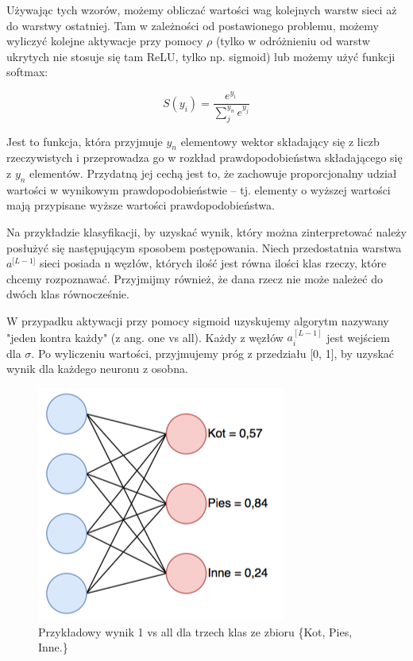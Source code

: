 Używając tych wzorów, możemy obliczać wartości wag kolejnych warstw sieci aż do warstwy ostatniej. Tam w zależności od postawionego problemu, możemy wyliczyć kolejne aktywacje przy pomocy \(\rho\) (tylko w odróżnieniu od warstw ukrytych nie stosuje się tam ReLU, tylko np. sigmoid) lub możemy użyć funkcji softmax:

\[S(y_{i}) = \frac{e^{y_{\text{i\ }}}}{\sum_{j}^{y_{n}}e^{y_{j}}}\]

Jest to funkcja, która przyjmuje \(y_{n}\) elementowy wektor składający się z liczb rzeczywistych i przeprowadza go w rozkład prawdopodobieństwa składającego się z \(y_{n}\) elementów. Przydatną jej cechą jest to, że zachowuje proporcjonalny udział wartości w wynikowym prawdopodobieństwie -- tj. elementy o wyższej wartości mają przypisane wyższe wartości prawdopodobieństwa.

Na przykładzie klasyfikacji, by uzyskać wynik, który można zinterpretować należy posłużyć się następującym sposobem postępowania. Niech przedostatnia warstwa \(a^{\lbrack L - 1\rbrack}\) sieci posiada n węzłów, których ilość jest równa ilości klas rzeczy, które chcemy rozpoznawać. Przyjmijmy również, że dana rzecz nie może należeć do dwóch klas równocześnie.

W przypadku aktywacji przy pomocy sigmoid uzyskujemy algorytm nazywany "jeden kontra każdy" (z ang. one vs all). Każdy z węzłów \(a_{i}^{\left\lbrack L - 1 \right\rbrack}\) jest wejściem dla \(\sigma\). Po wyliczeniu wartości, przyjmujemy próg z przedziału {[}0, 1{]}, by uzyskać wynik dla każdego neuronu z osobna.

\begin{figure}[ht]
\centerline{\includegraphics[scale=1]{resources/1v_all.png}}
\caption{Przykładowy wynik 1 vs all dla trzech klas ze zbioru \big\{Kot, Pies, Inne.\big\}}
\label{fig:1v_all}
\end{figure}

